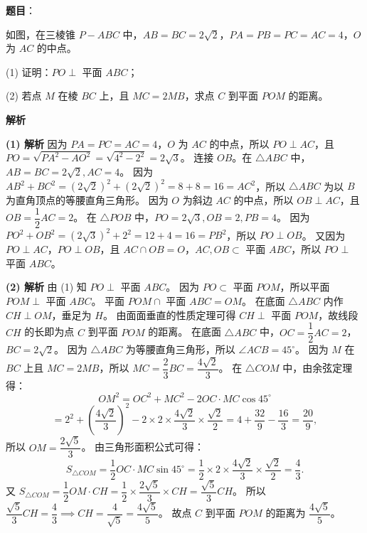 \begin{answer}

\textbf{题目}：

如图，在三棱锥 $P-ABC$ 中，$AB=BC=2\sqrt2$，$PA=PB=PC=AC=4$，$O$ 为 $AC$ 的中点。
\nopagebreak[4]
\begin{center}\end{center}
\nopagebreak[4]
(1) 证明：$PO\perp$ 平面 $ABC$；

(2) 若点 $M$ 在棱 $BC$ 上，且 $MC=2MB$，求点 $C$ 到平面 $POM$ 的距离。

\textbf{解析}

\textbf{(1) 解析} 因为 $PA=PC=AC=4$，$O$ 为 $AC$ 的中点，所以 $PO\perp AC$，且 $PO = \sqrt{PA^2-AO^2} = \sqrt{4^2-2^2} = 2\sqrt3$。
连接 $OB$。在 $\triangle ABC$ 中，$AB=BC=2\sqrt2, AC=4$。
因为 $AB^2+BC^2 = (2\sqrt2)^2+(2\sqrt2)^2 = 8+8=16=AC^2$，所以 $\triangle ABC$ 为以 $B$ 为直角顶点的等腰直角三角形。
因为 $O$ 为斜边 $AC$ 的中点，所以 $OB\perp AC$，且 $OB = \dfrac12 AC = 2$。
在 $\triangle POB$ 中，$PO=2\sqrt3, OB=2, PB=4$。
因为 $PO^2+OB^2 = (2\sqrt3)^2+2^2 = 12+4=16=PB^2$，所以 $PO\perp OB$。
又因为 $PO\perp AC$，$PO\perp OB$，且 $AC\cap OB=O$，$AC,OB\subset$ 平面 $ABC$，所以 $PO\perp$ 平面 $ABC$。

\textbf{(2) 解析} 由 (1) 知 $PO\perp$ 平面 $ABC$。
因为 $PO\subset$ 平面 $POM$，所以平面 $POM\perp$ 平面 $ABC$。
平面 $POM\cap$ 平面 $ABC = OM$。
在底面 $\triangle ABC$ 内作 $CH\perp OM$，垂足为 $H$。
由面面垂直的性质定理可得 $CH\perp$ 平面 $POM$，故线段 $CH$ 的长即为点 $C$ 到平面 $POM$ 的距离。
在底面 $\triangle ABC$ 中，$OC = \dfrac12 AC = 2$，$BC=2\sqrt2$。
因为 $\triangle ABC$ 为等腰直角三角形，所以 $\angle ACB = 45^\circ$。
因为 $M$ 在 $BC$ 上且 $MC=2MB$，所以 $MC = \dfrac23 BC = \dfrac{4\sqrt2}{3}$。
在 $\triangle COM$ 中，由余弦定理得：
\nopagebreak[4]
\[OM^2 = OC^2 + MC^2 - 2OC\cdot MC\cos 45^\circ\]
\nopagebreak[4]
\[= 2^2 + \left(\dfrac{4\sqrt2}{3}\right)^2 - 2\times 2\times\dfrac{4\sqrt2}{3}\times\dfrac{\sqrt2}{2} = 4 + \dfrac{32}{9} - \dfrac{16}{3} = \dfrac{20}{9},\]
所以 $OM = \dfrac{2\sqrt5}{3}$。
由三角形面积公式可得：
\nopagebreak[4]
\[S_{\triangle COM} = \dfrac12 OC\cdot MC\sin 45^\circ = \dfrac12\times 2\times\dfrac{4\sqrt2}{3}\times\dfrac{\sqrt2}{2} = \dfrac43.\]
又 $S_{\triangle COM} = \dfrac12 OM\cdot CH = \dfrac12\times\dfrac{2\sqrt5}{3}\times CH = \dfrac{\sqrt5}{3} CH$。
所以 $\dfrac{\sqrt5}{3} CH = \dfrac43 \implies CH = \dfrac{4}{\sqrt5} = \dfrac{4\sqrt5}{5}$。
故点 $C$ 到平面 $POM$ 的距离为 $\dfrac{4\sqrt5}{5}$。



\end{answer}

